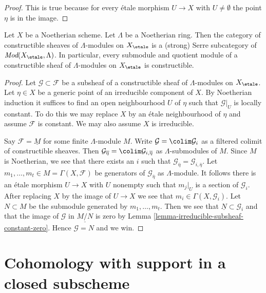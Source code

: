 \begin{proof}
This is true because for every \'etale morphism $U \to X$
with $U \not = \emptyset$ the point $\eta$ is in the image.
\end{proof}

\begin{proposition}
\label{proposition-constructible-over-noetherian}
Let $X$ be a Noetherian scheme. Let $\Lambda$ be a Noetherian ring.
Then the category of constructible sheaves of $\Lambda$-modules
on $X_\etale$ is a (strong) Serre subcategory of
$\textit{Mod}(X_\etale, \Lambda)$. In particular, every submodule
and quotient module of a constructible sheaf of $\Lambda$-modules
on $X_\etale$ is constructible.
\end{proposition}

\begin{proof}
Let $\mathcal{G} \subset \mathcal{F}$ be a subsheaf of a constructible
sheaf of $\Lambda$-modules on $X_\etale$. Let $\eta \in X$ be a generic
point of an irreducible component of $X$. By Noetherian induction
it suffices to find an open neighbourhood $U$ of $\eta$ such that
$\mathcal{G}|_U$ is locally constant. To do this we may replace $X$
by an \'etale neighbourhood of $\eta$ and assume $\mathcal{F}$ is constant.
We may also assume $X$ is irreducible.

\medskip\noindent
Say $\mathcal{F} = \underline{M}$ for some finite $\Lambda$-module $M$.
Write $\mathcal{G} = \colim \mathcal{G}_i$ as a filtered colimit
of constructible sheaves. Then
$\mathcal{G}_{\overline{\eta}} = \colim \mathcal{G}_{i, \overline{\eta}}$
as $\Lambda$-submodules of $M$. Since $M$ is Noetherian, we see that
there exists an $i$ such that
$\mathcal{G}_{\overline{\eta}} = \mathcal{G}_{i, \overline{\eta}}$.
Let $m_1, \ldots, m_t \in M = \Gamma(X, \mathcal{F})$ be generators of
$\mathcal{G}_{\overline{\eta}}$ as $\Lambda$-module.
It follows there is an \'etale morphism $U \to X$ with $U$ nonempty
such that $m_j|_U$ is a section of $\mathcal{G}_i$.
After replacing $X$ by the image of $U \to X$ we see that
$m_i \in \Gamma(X, \mathcal{G}_i)$. Let $N \subset M$ be the
submodule generated by $m_1, \ldots, m_t$.
Then we see that $\underline{N} \subset \mathcal{G}_i$ and that
the image of $\mathcal{G}$ in $\underline{M/N}$
is zero by Lemma \ref{lemma-irreducible-subsheaf-constant-zero}.
Hence $\mathcal{G} = N$ and we win.
\end{proof}






\section{Cohomology with support in a closed subscheme}
\label{section-cohomology-support}

